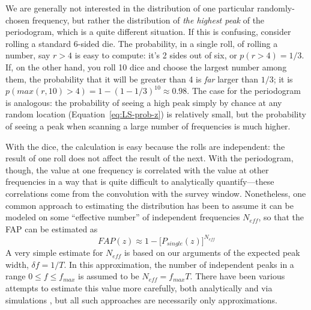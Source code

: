 \documentclass[preprint]{aastex}
\newcommand{\Eq}[1]{Equation~\ref{eq:#1}}
\newcommand{\eq}[1]{\Eq{#1}}
\newcommand{\eqlabel}[1]{\label{eq:#1}}
\begin{document}

We are generally not interested in the distribution of one particular
randomly-chosen frequency,
but rather the distribution of {\it the highest peak} of the
periodogram, which is a quite different situation.
If this is confusing, consider rolling a standard 6-sided die.
The probability, in a single roll, of rolling a number, say $r > 4$ is easy
to compute: it's 2 sides out of six, or $p(r>4) = 1/3$.
If, on the other hand, you roll 10 dice and choose the largest number among
them, the probability that it will be greater than 4 is {\it far} larger
than $1/3$; it is $p(max(r,10) > 4) = 1 - (1 - 1/3)^{10} \approx 0.98$.
The case for the periodogram is analogous: the probability of seeing a high peak
simply by chance at any random location (\eq{LS-prob-z}) is relatively small,
but the probability of seeing a peak when scanning a large number of
frequencies is much higher.

With the dice, the calculation is easy because the rolls are independent: the
result of one roll does not affect the result of the next.
With the periodogram, though, the value at one frequency is correlated with
the value at other frequencies in a way that is quite difficult to analytically
quantify---these correlations come from the convolution with the survey
window.
Nonetheless, one common approach to estimating the distribution has been to
assume it can be modeled on some ``effective number'' of independent
frequencies $N_{eff}$, so that the FAP can be estimated as
\begin{equation}
  FAP(z) \approx 1 - \big[P_{single}(z)\big]^{N_{eff}}
  \eqlabel{FAP-neff}
\end{equation}
A very simple estimate for $N_{eff}$ is based on our arguments of the
expected peak width, $\delta f = 1/T$.
In this approximation, the number of independent peaks in a range
$0 \le f \le f_{max}$ is assumed to be $N_{eff} = f_{max} T$.
There have been various attempts to estimate this value more carefully,
both analytically and via simulations
\citep[see, e.g.][]{Horne86,Schwarzenberg-Czerny98,Cumming04,Frescura08},
but all such approaches are necessarily only approximations.

\end{document}
